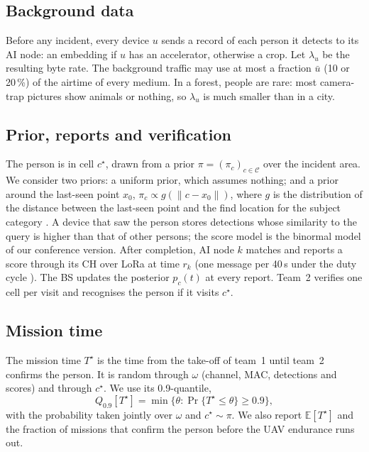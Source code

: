 \subsection{Background data}
Before any incident, every device $u$ sends a record of each person it detects to its AI node: an embedding if $u$ has
an accelerator, otherwise a crop. Let $\lambda_u$ be the resulting byte rate. The background traffic may use at most a
fraction $\bar u$ (10 or 20\,\%) of the airtime of every medium. In a forest, people are rare: most camera-trap
pictures show animals or nothing, so $\lambda_u$ is much smaller than in a city. 

\subsection{Prior, reports and verification}
The person is in cell $c^\star$, drawn from a prior $\pi=(\pi_c)_{c\in\mathcal C}$ over the incident area. We consider
two priors: a uniform prior, which assumes nothing; and a prior around the last-seen point $x_0$,
$\pi_c\propto g(\lVert c-x_0\rVert)$, where $g$ is the distribution of the distance between the last-seen point and the
find location for the subject category \cite{koester2008}.  A device that saw the
person stores detections whose similarity to the query is higher than that of other persons; the score model is the
binormal model of our conference version. After completion, AI node $k$ matches and reports a score through its CH over
LoRa at time $r_k$ (one message per 40\,s under the duty cycle \cite{etsi220}). The BS updates the posterior $p_c(t)$ at
every report. Team~2 verifies one cell per visit and recognises the person if it visits $c^\star$.

\subsection{Mission time}
The mission time $T^\star$ is the time from the take-off of team~1 until team~2 confirms the person. It is random
through $\omega$ (channel, MAC, detections and scores) and through $c^\star$. We use its 0.9-quantile,
\begin{equation}
Q_{0.9}[T^\star]=\min\bigl\{\theta:\Pr\{T^\star\le\theta\}\ge0.9\bigr\},\label{eq:quantile}
\end{equation}
with the probability taken jointly over $\omega$ and $c^\star\sim\pi$.  We also report $\mathbb E[T^\star]$
and the fraction of missions that confirm the person before the UAV endurance runs out.
